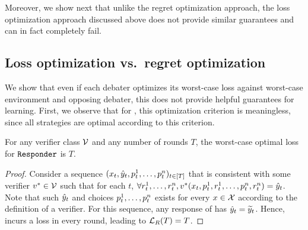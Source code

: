 \documentclass[11pt,letterpaper]{article}
\theoremstyle{definition}
\theoremstyle{plain}
\begin{document}
Moreover, we show next that unlike the regret optimization approach, the loss optimization approach discussed above does not provide similar guarantees and can in fact completely fail. 

\subsection{Loss optimization vs.~regret optimization}

We show that even if each debater optimizes its worst-case loss against worst-case environment and opposing debater, this does not provide helpful guarantees for learning. 
First, we observe that for \df, this optimization criterion is  meaningless, since all \df strategies are optimal according to this criterion. 

\begin{claim}\label{claim:deb2}
    For any verifier class ${\mathcal V}$ and any number of rounds $T$, the worst-case optimal loss for $\texttt{Responder}$ is $T$. 
\end{claim}
\begin{proof}
Consider a sequence $(x_t,{\hat{y}}_t,{p}_t^1, \ldots, {p}_t^n)_{t \in [T]}$ that is consistent with some verifier $v^* \in {\mathcal V}$ such that for each $t$, $\forall {r}_t^1, \ldots, {r}_t^n, v^*(x_t, {p}_t^1,{r}_t^1, \ldots, {p}_t^n, {r}_t^n) = {\hat{y}}_t$. Note that such ${\hat{y}}_t$ and choices ${p}_t^1, \ldots, {p}_t^n$ exists for every $x \in {\mathcal X}$ according to the definition of a verifier. 
For this sequence, any response of \df has ${\hat{y}}_t = {\widetilde{y}}_t$. Hence, \df incurs a loss in every round, leading to ${{\mathcal L}_R}(T) = T$.
\end{proof}
\end{document}

